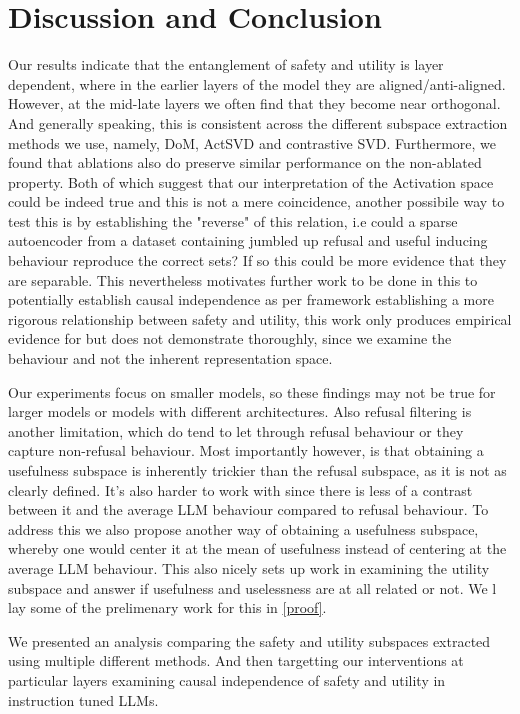 \section{Discussion and Conclusion}
Our results indicate that the entanglement of safety and utility is layer dependent,
where in the earlier layers of the model they are aligned/anti-aligned. However, at the
mid-late layers we often find that they become near orthogonal. And generally speaking,
this is consistent across the different subspace extraction methods we use, namely,
DoM, ActSVD and contrastive SVD. Furthermore, we found that ablations also do preserve
similar performance on the non-ablated property. Both of which suggest that our 
interpretation of the Activation space could be indeed true and this is 
not a mere coincidence, another possibile way to test this is by establishing the 
"reverse" of this relation, i.e could a sparse autoencoder from a dataset containing
jumbled up refusal and useful inducing behaviour reproduce the correct sets? If so 
this could be more evidence that they are separable. This nevertheless motivates further
work to be done in this to potentially establish causal independence as per
\citet{park2023LRH} framework establishing a more rigorous relationship between 
safety and utility, this work only produces empirical evidence for but does not 
demonstrate thoroughly, since we examine the behaviour and not the inherent
representation space. 

Our experiments focus on smaller models, so these findings may not be true for larger
models or models with different architectures. Also refusal filtering is another 
limitation, which do tend to let through refusal behaviour or they capture non-refusal
behaviour. Most importantly however, is that obtaining a usefulness subspace is inherently
trickier than the refusal subspace, as it is not as clearly defined. It's also harder to
work with since there is less of a contrast between it and the average LLM behaviour compared
to refusal behaviour. To address this we also propose another way of obtaining
a usefulness subspace, whereby one would center it at the mean of usefulness instead of
centering at the average LLM behaviour. This also nicely sets up work in examining the utility
subspace and answer if usefulness and uselessness are at all related or not. We l lay 
some of the prelimenary work for this in \ref{proof}.

We presented an analysis comparing the safety and utility subspaces extracted using 
multiple different methods. And then targetting our interventions at particular layers
examining causal independence of safety and utility in instruction tuned LLMs.